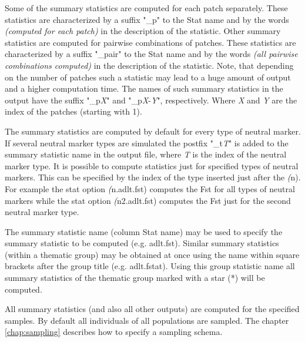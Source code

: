 \documentclass[letterpaper,12pt,oneside]{book}
\begin{document}
Some of the summary statistics are computed for each patch separately. These statistics are characterized by a suffix "\_p" to the \textsf{Stat name} and by the words \textit{(computed for each patch)} in the description of the statistic. Other summary statistics are computed for pairwise combinations of patches. These statistics are characterized by a suffix "\_pair" to the \textsf{Stat name} and by the words \textit{(all pairwise combinations computed)} in the description of the statistic. Note, that depending on the number of patches such a statistic may lead to a huge amount of output and a higher computation time. The names of such summary statistics in the output have the suffix "\_p\textit{X}" and "\_p\textit{X}-\textit{Y}", respectively. Where \textit{X} and \textit{Y} are the index of the patches (starting with 1). 

The summary statistics are computed by default for every type of neutral marker. If several neutral marker types are simulated the postfix "\_t\textit{T}" is added to the summary statistic name in the output file, where \textit{T} is the index of the neutral marker type. It is possible to compute statistics just for specified types of neutral markers. This can be specified by the index of the type inserted just after the \textit(n). For example the stat option \textit(n.adlt.fst) computes the Fst for all types of neutral markers while the stat option \textit(n2.adlt.fst) computes the Fst just for the second neutral marker type. 

The summary statistic name (column \textsf{Stat name}) may be used to specify the summary statistic to be computed (e.g. \textsf{adlt.fst}). Similar summary statistics (within a thematic group) may be obtained at once using the name within square brackets after the group title (e.g. \textsf{adlt.fstat}). Using this group statistic name all summary statistics of the thematic group marked with a star (*) will be computed. 

All summary statistics (and also all other outputs) are computed for the specified samples. By default all individuals of all populations are sampled. The chapter \ref{chap:sampling} describes how to specify a sampling schema.
\\
\\
\end{document}
